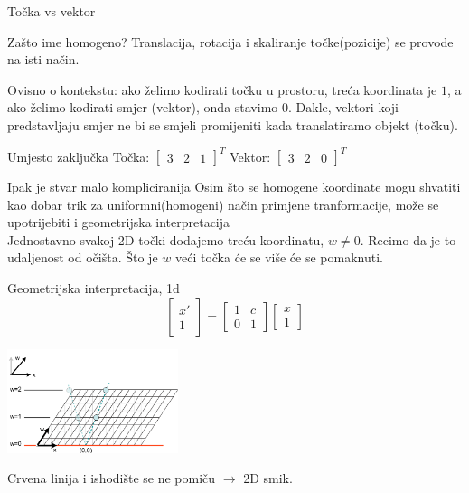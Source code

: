 \documentclass[9pt]{beamer}
\begin{document}
\begin{frame}{Točka vs vektor}
	\begin{block}{Zašto ime homogeno?}
		Translacija, rotacija i skaliranje točke(pozicije) se provode na isti način.
	\end{block}
	Ovisno o kontekstu: ako želimo kodirati točku u prostoru, treća koordinata je $1$, 
	a ako želimo kodirati smjer (vektor), onda stavimo $0$. Dakle, vektori koji predstavljaju smjer ne bi se smjeli promijeniti kada translatiramo objekt (točku). 
	\begin{block}{Umjesto zaključka}
		Točka: $\left[ \begin{array}{ccc} 3 & 2 & 1\end{array}\right]^T$  \quad
		Vektor: $\left[ \begin{array}{ccc} 3&2&0\end{array}\right]^T$
	\end{block}
\end{frame}

\begin{frame}{Ipak je stvar malo kompliciranija}
	Osim što se homogene koordinate mogu shvatiti kao dobar trik za uniformni(homogeni) način primjene tranformacije, može se upotrijebiti i geometrijska interpretacija
	\\
	Jednostavno svakoj 2D točki dodajemo treću koordinatu, $w \neq 0$. Recimo da je to udaljenost od očišta.  Što je $w$ veći točka će se više će se pomaknuti.
\end{frame}

\begin{frame}{Geometrijska interpretacija, 1d}
	\[    \left[ \begin{array}{c}
	x' \\ 1 \end{array} \right]  = \left[ \begin{array}{cc}
	1 &  c \\
	0 & 1 
	\end{array} \right]  \left[ \begin{array}{c}
	x \\ 1\end{array} \right]\]
	
	\begin{center}
		\includegraphics[width=5cm]{slike/translacija_1d_02.png}
	\end{center}
	Crvena linija i ishodište se ne pomiču $\rightarrow$ 2D smik.
\end{frame}
\end{document}
